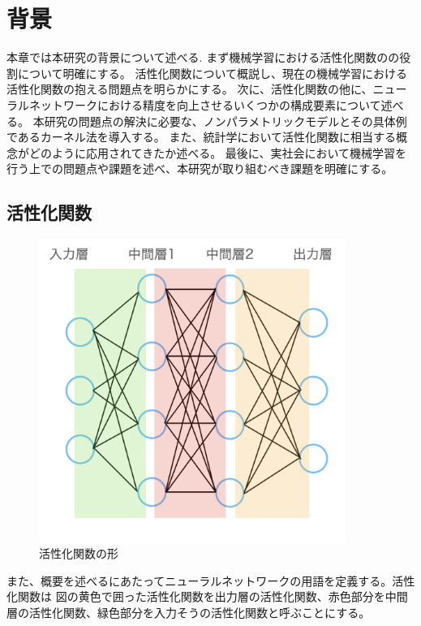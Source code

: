 \chapter{背景}
\label{background}

本章では本研究の背景について述べる.
まず機械学習における活性化関数のの役割について明確にする。
活性化関数について概説し、現在の機械学習における活性化関数の抱える問題点を明らかにする。
次に、活性化関数の他に、ニューラルネットワークにおける精度を向上させるいくつかの構成要素について述べる。
本研究の問題点の解決に必要な、ノンパラメトリックモデルとその具体例であるカーネル法を導入する。
また、統計学において活性化関数に相当する概念がどのように応用されてきたか述べる。
最後に、実社会において機械学習を行う上での問題点や課題を述べ、本研究が取り組むべき課題を明確にする。



\section{活性化関数}

\begin{figure}[hbtp]
    \begin{center}
        \includegraphics[width=10cm]{asset/neural_network1.png}
            \caption{活性化関数の形}
            \label{neural_network1}
    \end{center}
\end{figure}

また、概要を述べるにあたってニューラルネットワークの用語を定義する。活性化関数は
図の黄色で囲った活性化関数を出力層の活性化関数、赤色部分を中間層の活性化関数、緑色部分を入力そうの活性化関数と呼ぶことにする。

